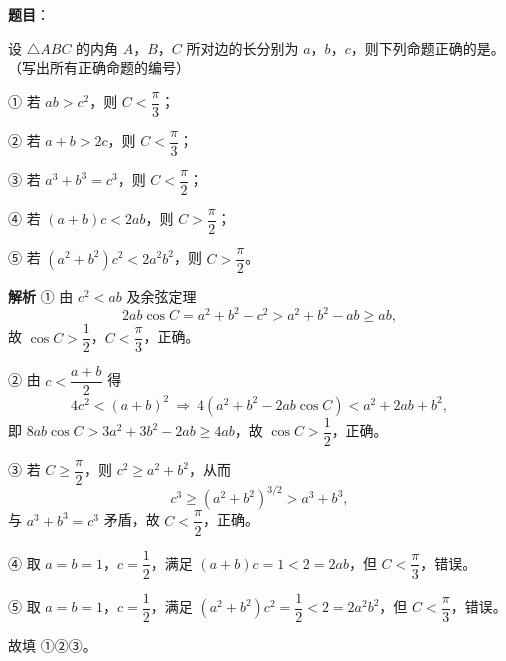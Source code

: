 \begin{answer}

\textbf{题目}：

设 $\triangle ABC$ 的内角 $A$，$B$，$C$ 所对边的长分别为 $a$，$b$，$c$，则下列命题正确的是\gkblank{}。（写出所有正确命题的编号）

① 若 $ab>c^2$，则 $C<\dfrac\pi3$；

② 若 $a+b>2c$，则 $C<\dfrac\pi3$；

③ 若 $a^3+b^3=c^3$，则 $C<\dfrac\pi2$；

④ 若 $(a+b)c<2ab$，则 $C>\dfrac\pi2$；

⑤ 若 $(a^2+b^2)c^2<2a^2b^2$，则 $C>\dfrac\pi2$。

\textbf{解析}
① 由 $c^2<a b$ 及余弦定理
\nopagebreak[4]
\[2ab\cos C=a^2+b^2-c^2>a^2+b^2-ab\geqslant ab,\]
故 $\cos C>\dfrac12$，$C<\dfrac\pi3$，正确。

② 由 $c<\dfrac{a+b}2$ 得
\nopagebreak[4]
\[4c^2<(a+b)^2\ \Rightarrow\ 4(a^2+b^2-2ab\cos C)<a^2+2ab+b^2,\]
即 $8ab\cos C>3a^2+3b^2-2ab\geqslant4ab$，故 $\cos C>\dfrac12$，正确。

③ 若 $C\geqslant\dfrac\pi2$，则 $c^2\geqslant a^2+b^2$，从而
\nopagebreak[4]
\[c^3\geqslant(a^2+b^2)^{3/2}>a^3+b^3,\]
与 $a^3+b^3=c^3$ 矛盾，故 $C<\dfrac\pi2$，正确。

④ 取 $a=b=1$，$c=\dfrac12$，满足 $(a+b)c=1<2=2ab$，但 $C<\dfrac\pi3$，错误。

⑤ 取 $a=b=1$，$c=\dfrac12$，满足 $(a^2+b^2)c^2=\dfrac12<2=2a^2b^2$，但 $C<\dfrac\pi3$，错误。

故填 ①②③。


\end{answer}
